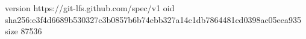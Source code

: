 version https://git-lfs.github.com/spec/v1
oid sha256:e3f4d6689b530327c3b0857b6b74ebb327a14c1db7864481cd0398ac05eea935
size 87536
